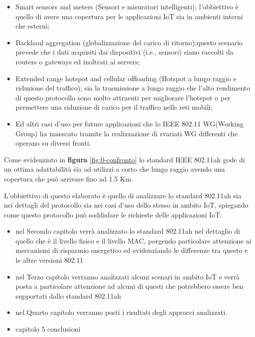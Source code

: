 \begin{itemize}
	\item Smart sensors and meters (Sensori e misuratori intelligenti); l'obbiettivo è quello di avere una copertura per le applicazioni IoT sia in ambienti interni che esterni; 
	\item Backhaul aggregation (globalizzazione del carico di ritorno);questo scenario prevede che i dati acquisiti dai dispositivi (i.e., sensori) siano raccolti da routers o gateways ed inoltrati ai servers; 
	\item Extended range hotspot and cellular offloading (Hotspot a lungo raggio e riduzione del traffico); sia la trasmissione a lungo raggio che l'alto rendimento di questo protocollo sono molto attraenti per migliorare l'hotspot o per permettere una riduzione di carico per il traffico nelle reti mobili;
	\item Ed altri casi d'uso per future applicazioni che lo IEEE 802.11 WG(Working Group) ha innescato tramite la realizzazione di svariati WG differenti che operano su diversi fronti. 
\end{itemize}


Come evidenziato in \textbf {figura} \ref{fig:0-confronto} lo standard IEEE 802.11ah gode di un ottima adattabilità sia ad utilizzi a corto che lungo raggio avendo una copertura che può arrivare fino ad 1.5 Km.

L'obbiettivo di questo elaborato è quello di analizzare lo standard 802.11ah sia nei dettagli del protocollo sia nei casi d'uso dello stesso in ambito IoT, spiegando come questo protocollo può soddisfare le richieste delle applicazioni IoT:
\begin{itemize}
	\item nel Secondo capitolo verrà analizzato lo standard 802.11ah nel dettaglio di quello che è il livello fisico e il livello MAC, porgendo particolare attenzione ai meccanismi di risparmio energetico ed evidenziando le differenze tra questo e le altre versioni 802.11
	\item nel Terzo capitolo verranno analizzati alcuni scenari in ambito IoT e verrà posta a particolare attenzione ad alcuni di questi che potrebbero essere ben supportati dallo standard 802.11ah 
	\item nel Quarto capitolo verranno posti i risultati degli approcci analizzati.
	\item capitolo 5 conclusioni
\end{itemize}
    




\clearpage